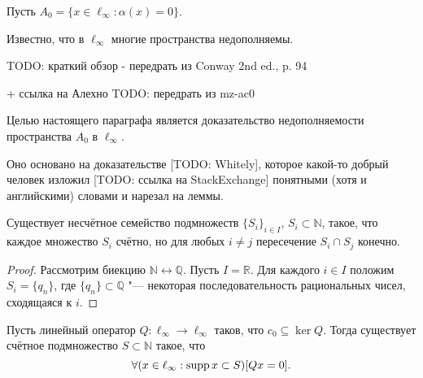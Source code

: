 Пусть $A_0 = \{x\in\ell_\infty : \alpha(x) = 0\}$.

Известно, что в $\ell_\infty$ многие пространства недополняемы.

TODO: краткий обзор - передрать из Conway 2nd ed., p. 94

+ ссылка на Алехно TODO: передрать из mz-ac0

Целью настоящего параграфа является доказательство недополняемости пространства $A_0$ в $\ell_\infty$.

Оно основано на доказательстве [TODO: Whitely],
которое какой-то добрый человек изложил
[TODO: ссылка на StackExchange] понятными (хотя и английскими) словами и нарезал на леммы.

\begin{lemma}
	\label{lem:uncountable_subsets_of_N_with_finite_intersections}
	Существует несчётное семейство подмножеств $\{S_i\}_{i\in I}$, $S_i \subset \mathbb{N}$,
	такое, что каждое множество $S_i$ счётно, но для любых $i\neq j$ пересечение $S_i \cap S_j$ конечно.
\end{lemma}

\begin{proof}
	Рассмотрим биекцию $\mathbb{N} \leftrightarrow \mathbb{Q}$.
	Пусть $I = \mathbb{R}$.
	Для каждого $i\in I$ положим $S_i = \{q_n\}$,
	где $\{q_n\} \subset \mathbb{Q}$ "--- некоторая последовательность рациональных чисел,
	сходящаяся к $i$.
\end{proof}

\begin{lemma}
	\label{lem:c_0_not_complemented}
	Пусть линейный оператор $Q: \ell_\infty \to \ell_{\infty}$ таков, что $c_0\subseteq \ker Q$.
	Тогда существует счётное подмножество $S \subset \mathbb{N}$ такое, что
	\begin{equation}
		\forall(x \in \ell_\infty : \operatorname{supp} x \subset S)[Qx = 0]
		.
	\end{equation}
\end{lemma}

